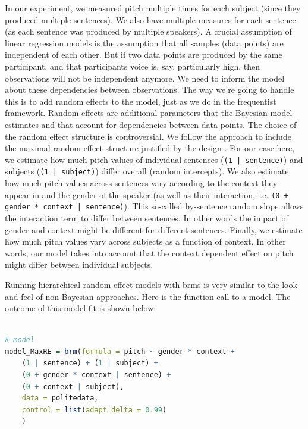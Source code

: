 \documentclass[nobib]{tufte-handout}
\begin{document}
In our experiment, we measured pitch multiple times for each subject (since they produced
multiple sentences). We also have multiple measures for each sentence (as each sentence was
produced by multiple speakers). A crucial assumption of linear regression models is the
assumption that all samples (data points) are independent of each other. But if two data points are produced by the same participant,
and that participants voice is, say, particularly high, then observations will not be
independent anymore. We need to inform the model about these dependencies between observations. The way we’re going to handle this is to add random effects to the model, just as we do in the frequentist framework. Random effects are additional parameters that the Bayesian model estimates and that account for dependencies between data points. The choice of the random effect structure is controversial. We follow the approach to include the maximal random effect structure justified by the design \citep{barr2013random} \citep[for an alternative view on random effect specifications, see][]{matuschek2017balancing}. For our case here, we estimate how much pitch values of individual sentences (\texttt{(1 | sentence)}) and subjects  (\texttt{(1 | subject)})  differ overall (random intercepts). We also estimate how much pitch values across sentences vary according to the context they appear in and the gender of the speaker (as well as their interaction, i.e. \texttt{(0 + gender * context | sentence)}). This so-called by-sentence random slope allows the interaction term to differ between sentences. In other words the impact of gender and context might be different for different sentences. Finally, we estimate how much pitch values vary across subjects as a function of context. In other words, our model takes into account that the context dependent effect on pitch might differ between individual subjects.

Running hierarchical random effect models with \textrm{brms} is very similar to the look and feel of non-Bayesian approaches. Here is the function call to a model.
The outcome of this model fit is shown below:

\bigskip

\begin{minipage}[]{1\textwidth}
\begin{lstlisting}[language=R]

# model
model_MaxRE = brm(formula = pitch ~ gender * context +
	(1 | sentence) + (1 | subject) + 
	(0 + gender * context | sentence) +
	(0 + context | subject),
	data = politedata,
	control = list(adapt_delta = 0.99)
	)
\end{lstlisting}
\end{minipage}
\end{document}
